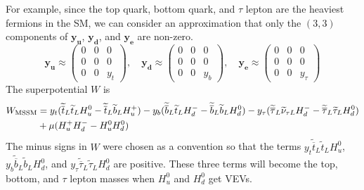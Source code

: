 \documentclass[12pt]{report}
\begin{document}
For example, since the top quark, bottom quark, and $\tau$ lepton are the heaviest fermions in the SM, we can consider an approximation that only the $(3, 3)$ components of $\mathbf{y_{u}}$, $\mathbf{y_{d}}$, and $\mathbf{y_{e}}$ are non-zero.
\begin{equation}
\mathbf{y_{u}} \approx \left( \begin{array}{ccc} 0 & 0 & 0\\ 0 & 0 & 0\\ 0 & 0 & y_{t} \end{array}\right), \quad
\mathbf{y_{d}} \approx \left( \begin{array}{ccc} 0 & 0 & 0\\ 0 & 0 & 0\\ 0 & 0 & y_{b} \end{array}\right), \quad
\mathbf{y_{e}} \approx \left( \begin{array}{ccc} 0 & 0 & 0\\ 0 & 0 & 0\\ 0 & 0 & y_{\tau} \end{array}\right)
\end{equation}
The superpotential $W$ is
\begin{align}
W_{\mathrm{MSSM}} &= 
  y_{t} (\widetilde{\overline{t}}_{L} \widetilde{t}_{L} H^{0}_{u} - \widetilde{\overline{t}}_{L} \widetilde{b}_{L} H^{+}_{u})
- y_{b} (\widetilde{\overline{b}}_{L} \widetilde{t}_{L} H^{-}_{d} - \widetilde{\overline{b}}_{L} \widetilde{b}_{L} H^{0}_{d})
- y_{\tau} (\widetilde{\overline{\tau}}_{L} \widetilde{\nu}_{\tau L} H^{-}_{d} - \widetilde{\overline{\tau}}_{L} \widetilde{\tau}_{L} H^{0}_{d}) \notag \\
& + \mu (H^{+}_{u} H^{-}_{d} - H^{0}_{u} H^{0}_{d})
\end{align}
The minus signs in $W$ were chosen as a convention so that the terms $y_{t} \widetilde{\overline{t}}_{L} \widetilde{t}_{L} H^{0}_{u}$, $y_{b} \widetilde{\overline{b}}_{L} \widetilde{b}_{L} H^{0}_{d}$, and $y_{\tau} \widetilde{\overline{\tau}}_{L} \widetilde{\tau}_{L} H^{0}_{d}$ are positive. These three terms will become the top, bottom, and $\tau$ lepton masses when $H^{0}_{u}$ and $H^{0}_{d}$ get VEVs.
\end{document}
